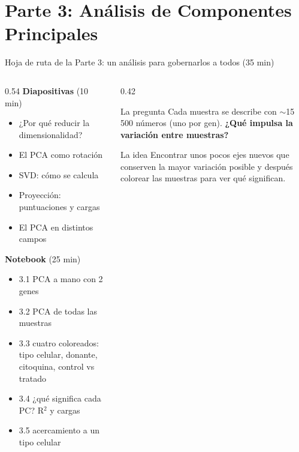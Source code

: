 \section{Parte 3: Análisis de Componentes Principales}

\begin{frame}{Hoja de ruta de la Parte 3: un análisis para gobernarlos a todos (35 min)}
  \footnotesize
  \begin{columns}[T]
    \begin{column}{0.54\linewidth}
      \textbf{Diapositivas} (10 min)
      \begin{itemize}\setlength\itemsep{1pt}
        \item ¿Por qué reducir la dimensionalidad?
        \item El PCA como \alert{rotación}
        \item \alert{SVD}: cómo se calcula
        \item \alert{Proyección}: puntuaciones y cargas
        \item El PCA en distintos campos
      \end{itemize}
      \vspace{0.1cm}
      \textbf{Notebook} (25 min)
      \begin{itemize}\setlength\itemsep{1pt}
        \item 3.1 PCA a mano con 2 genes
        \item 3.2 PCA de todas las muestras
        \item 3.3 cuatro coloreados: tipo celular, donante, citoquina, control vs tratado
        \item 3.4 ¿qué significa cada PC? R$^2$ y cargas
        \item 3.5 acercamiento a un tipo celular
      \end{itemize}
    \end{column}
    \begin{column}{0.42\linewidth}
      \begin{block}{La pregunta}
        Cada muestra se describe con $\sim$15\,500 números (uno por gen). \textbf{¿Qué impulsa la variación entre muestras?}
      \end{block}
      \begin{block}{La idea}
        Encontrar unos pocos ejes nuevos que conserven la mayor variación posible y después \alert{colorear las muestras} para ver qué significan.
      \end{block}
    \end{column}
  \end{columns}
\end{frame}

